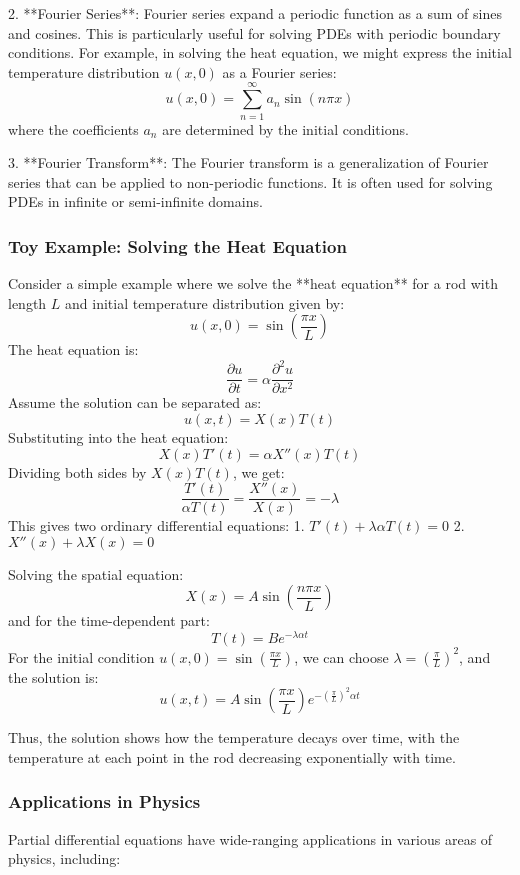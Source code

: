 \documentclass{article}
\begin{document}
2. **Fourier Series**:
   Fourier series expand a periodic function as a sum of sines and cosines. This is particularly useful for solving PDEs with periodic boundary conditions. For example, in solving the heat equation, we might express the initial temperature distribution \( u(x, 0) \) as a Fourier series:
   \[
   u(x, 0) = \sum_{n=1}^{\infty} a_n \sin(n\pi x)
   \]
   where the coefficients \( a_n \) are determined by the initial conditions.

3. **Fourier Transform**:
   The Fourier transform is a generalization of Fourier series that can be applied to non-periodic functions. It is often used for solving PDEs in infinite or semi-infinite domains.

\subsubsection*{Toy Example: Solving the Heat Equation}

Consider a simple example where we solve the **heat equation** for a rod with length \( L \) and initial temperature distribution given by:
\[
u(x, 0) = \sin\left( \frac{\pi x}{L} \right)
\]
The heat equation is:
\[
\frac{\partial u}{\partial t} = \alpha \frac{\partial^2 u}{\partial x^2}
\]
Assume the solution can be separated as:
\[
u(x, t) = X(x)T(t)
\]
Substituting into the heat equation:
\[
X(x)T'(t) = \alpha X''(x)T(t)
\]
Dividing both sides by \( X(x)T(t) \), we get:
\[
\frac{T'(t)}{\alpha T(t)} = \frac{X''(x)}{X(x)} = -\lambda
\]
This gives two ordinary differential equations:
1. \( T'(t) + \lambda \alpha T(t) = 0 \)
2. \( X''(x) + \lambda X(x) = 0 \)

Solving the spatial equation:
\[
X(x) = A \sin\left( \frac{n\pi x}{L} \right)
\]
and for the time-dependent part:
\[
T(t) = B e^{-\lambda \alpha t}
\]
For the initial condition \( u(x, 0) = \sin\left( \frac{\pi x}{L} \right) \), we can choose \( \lambda = \left( \frac{\pi}{L} \right)^2 \), and the solution is:
\[
u(x, t) = A \sin\left( \frac{\pi x}{L} \right) e^{-\left( \frac{\pi}{L} \right)^2 \alpha t}
\]

Thus, the solution shows how the temperature decays over time, with the temperature at each point in the rod decreasing exponentially with time.

\subsubsection*{Applications in Physics}

Partial differential equations have wide-ranging applications in various areas of physics, including:
\end{document}
